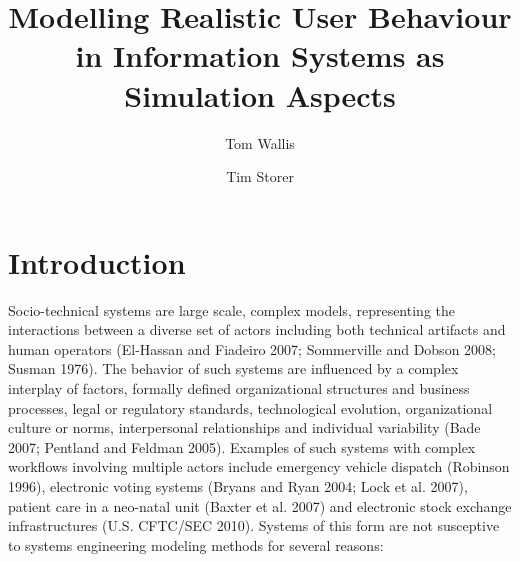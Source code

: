 \documentclass{llncs}
\title{Modelling Realistic User Behaviour in Information Systems as Simulation Aspects}
\author{Tom Wallis\orcidID{} \and Tim Storer\orcidID{}}
\institute{University of Glasgow, Glasgow, Scotland,\\
  \email{twallisgm@gmail.com},\\
  \email{timothy.storer@glasgow.ac.uk},
}
\begin{document}

\maketitle


\begin{abstract}

\end{abstract}


\section{Introduction}
\label{sec:introduction}


Socio-technical systems are large scale, complex models, representing the interactions between a diverse set of actors
including both technical artifacts and human operators (El-Hassan and Fiadeiro 2007; Sommerville and Dobson 2008; Susman
1976).  The behavior of such systems are influenced by a complex interplay of factors, formally defined organizational
structures and business processes, legal or regulatory standards, technological evolution, organizational culture or
norms, interpersonal relationships and individual variability (Bade 2007; Pentland and Feldman 2005). Examples of such
systems with complex workflows involving multiple actors include emergency vehicle dispatch (Robinson 1996), electronic
voting systems (Bryans and Ryan 2004; Lock et al. 2007), patient care in a neo-natal unit (Baxter et al. 2007) and
electronic stock exchange infrastructures (U.S. CFTC/SEC 2010).  Systems of this form are not susceptive to systems
engineering modeling methods for several reasons:
\end{document}

